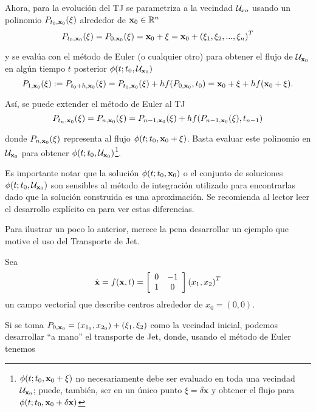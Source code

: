 Ahora, para la evolución del TJ se parametriza a la vecindad $\mathcal{U}_{xo}$ usando un polinomio $P_{t_0,\mathbf{x}_0}(\xi)$ alrededor de $\mathbf{x}_0 \in \mathbb{R}^n$ 
\begin{equation*}
 P_{t_0,\mathbf{x}_0}(\xi) = P_{0,\mathbf{x}_0}(\xi) = \mathbf{x}_0 + \xi = \mathbf{x}_0 + \left( \xi_1, \xi_2, ..., \xi_n \right)^T
\end{equation*} 

y se evalúa con el método de Euler (o cualquier otro) para obtener el flujo de $\mathcal{U}_{\mathbf{x}_0}$ en algún tiempo $t$ posterior $\phi(t;t_0,\mathcal{U}_{\mathbf{x}_0} )$
\begin{equation*}
P_{1,\mathbf{x}_0}(\xi) := P_{t_0+h,\mathbf{x}_0}(\xi) = P_{t_0,\mathbf{x}_0}(\xi) + h f(P_{0,\mathbf{x}_0},t_0) = \mathbf{x}_0 + \xi + h f(\mathbf{x}_0 + \xi).
\end{equation*}

Así, se puede extender el método de Euler al TJ 
\begin{equation}
 P_{t_n,\mathbf{x}_0}(\xi) = P_{n,\mathbf{x}_0}(\xi) = P_{n-1,\mathbf{x}_0}(\xi) + h f(P_{n-1,\mathbf{x}_0}(\xi),t_{n-1})
 \label{eq:eulerU}
\end{equation}

donde $P_{n,\mathbf{x}_0}(\xi)$ representa al flujo $\phi(t;t_0,\mathbf{x}_0 + \xi)$. Basta evaluar este polinomio en $\mathcal{U}_{\mathbf{x}_0}$ para obtener $\phi(t;t_0,\mathcal{U}_{\mathbf{x}_0} )$\footnote{$\phi(t;t_0,\mathbf{x}_0 + \xi)$ no necesariamente debe ser evaluado en toda una vecindad $\mathcal{U}_{\mathbf{x}_0}$; puede, también, ser en un único punto $\xi =\delta \mathbf{x}$ y obtener el flujo para $\phi(t;t_0,\mathbf{x}_0 + \delta \mathbf{x})$}.

Es importante notar que la solución $\phi(t;t_0,\mathbf{x}_0)$ o el conjunto de soluciones $\phi(t;t_0,\mathcal{U}_{\mathbf{x}_0} )$ son sensibles al método de integración utilizado para encontrarlas dado que la solución construida es una aproximación. Se recomienda al lector leer el desarrollo explícito en \cite{Perez2015} para ver estas diferencias.

Para ilustrar un poco lo anterior, merece la pena desarrollar un ejemplo que motive el uso del Transporte de Jet.

Sea
\begin{align}
\dot{\mathbf{x}} = f(\mathbf{x},t) = \left[ \begin{array}{cc}
 0 & -1  \\
 1 & 0  \\
\end{array} \right] \left( x_1, x_2 \right)^T
\label{eq:center}
\end{align}
un campo vectorial que describe centros alrededor de $x_0 = (0,0)$. 

Si se toma $P_{0,\mathbf{x}_0} = (x_{1_0},x_{2_0}) + (\xi_1,\xi_2)$ como la vecindad inicial, podemos desarrollar ``a mano'' el transporte de Jet, donde, usando el método de Euler tenemos

